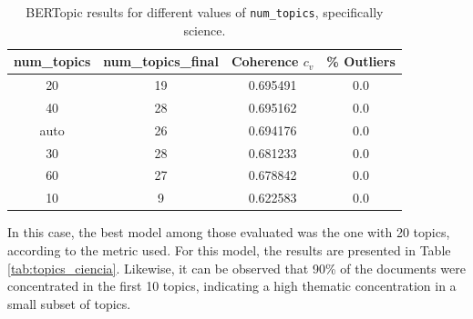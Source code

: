 \documentclass[11pt,a4paper]{article}
\begin{document}
		\begin{table}[H]
			\centering
			\caption{BERTopic results for different values of \texttt{num\_topics}, specifically science.}
			\begin{tabular}{c c c c}
				\hline
				\textbf{num\_topics} & \textbf{num\_topics\_final} & \textbf{Coherence $c_v$} & \textbf{\% Outliers} \\
				\hline
				20   & 19 & 0.695491 & 0.0 \\
				40   & 28 & 0.695162 & 0.0 \\
				auto & 26 & 0.694176 & 0.0 \\
				30   & 28 & 0.681233 & 0.0 \\
				60   & 27 & 0.678842 & 0.0 \\
				10   & 9  & 0.622583 & 0.0 \\
				\hline
			\end{tabular}
			\label{tab:bertopic_nr_topics_ciencia}
		\end{table}
		
		In this case, the best model among those evaluated was the one with 20 topics, according to the metric used. For this model, the results are presented in Table \ref{tab:topics_ciencia}. Likewise, it can be observed that 90\% of the documents were concentrated in the first 10 topics, indicating a high thematic concentration in a small subset of topics.
		
\end{document}
